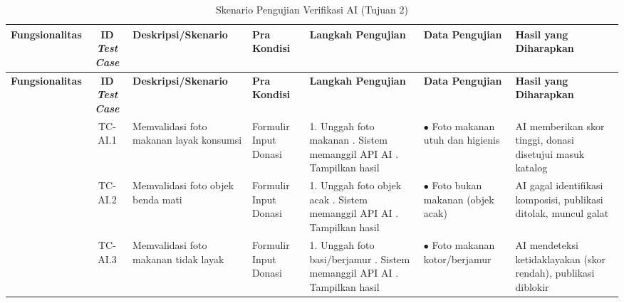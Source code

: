 \clearpage
\pagestyle{lscape}
\begin{landscape}
\begin{xltabular}{\linewidth}{|c|c|L|L|L|L|L|}
\caption{Skenario Pengujian Verifikasi AI (Tujuan 2)}
\label{tab:skenario-tujuan2} \\
\hline
{}
\centering\textbf{Fungsio\-nalitas} & \centering\textbf{ID \textit{Test Case}} & \centering\textbf{Deskripsi/Skenario} & \centering\textbf{Pra Kondisi} & \centering\textbf{Langkah Pengujian} & \centering\textbf{Data Pengujian} & \centering\arraybackslash\textbf{Hasil yang Diharapkan} \\ \hline
\endfirsthead

\hline
{}
\centering\textbf{Fungsio\-nalitas} & \centering\textbf{ID \textit{Test Case}} & \centering\textbf{Deskripsi/Skenario} & \centering\textbf{Pra Kondisi} & \centering\textbf{Langkah Pengujian} & \centering\textbf{Data Pengujian} & \centering\arraybackslash\textbf{Hasil yang Diharapkan} \\ \hline
\endhead

\hline
\endfoot

\hline
\endlastfoot

& TC-AI.1 & Memvalidasi foto makanan layak konsumsi & Formulir Input Donasi & 1. Unggah foto makanan . Sistem memanggil API AI . Tampilkan hasil & $\bullet$ Foto makanan utuh dan higienis & AI memberikan skor tinggi, donasi disetujui masuk katalog \\ 
& TC-AI.2 & Memvalidasi foto objek benda mati & Formulir Input Donasi & 1. Unggah foto objek acak . Sistem memanggil API AI . Tampilkan hasil & $\bullet$ Foto bukan makanan (objek acak) & AI gagal identifikasi komposisi, publikasi ditolak, muncul galat \\ 
& TC-AI.3 & Memvalidasi foto makanan tidak layak & Formulir Input Donasi & 1. Unggah foto basi/berjamur . Sistem memanggil API AI . Tampilkan hasil & $\bullet$ Foto makanan kotor/berjamur & AI mendeteksi ketidaklayakan (skor rendah), publikasi diblokir \\ \hline
\end{xltabular}
\end{landscape}
\clearpage
\pagestyle{fancy}

